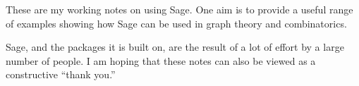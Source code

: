 \begin{preface}
%
\begin{para}
These are my working notes on using Sage. One aim is to provide a useful range of examples showing how Sage can be used in graph theory and combinatorics.
\end{para}
%
\begin{para}
Sage, and the packages it is built on, are the result of a lot of effort by a large number of people. I am hoping that these notes can also be viewed as a constructive ``thank you.''
\end{para}
%
\end{preface}
